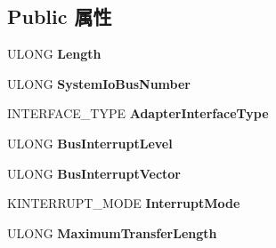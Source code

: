 \subsection*{Public 属性}
\begin{DoxyCompactItemize}
\item 
\mbox{\label{struct___p_o_r_t___c_o_n_f_i_g_u_r_a_t_i_o_n___i_n_f_o_r_m_a_t_i_o_n_acfa4e1f80fb1d9cda05190c6407d4021}} 
U\+L\+O\+NG {\bfseries Length}
\item 
\mbox{\label{struct___p_o_r_t___c_o_n_f_i_g_u_r_a_t_i_o_n___i_n_f_o_r_m_a_t_i_o_n_aaa068c659c7bdca99e1ef44c0681c4c6}} 
U\+L\+O\+NG {\bfseries System\+Io\+Bus\+Number}
\item 
\mbox{\label{struct___p_o_r_t___c_o_n_f_i_g_u_r_a_t_i_o_n___i_n_f_o_r_m_a_t_i_o_n_a58bdd656c1e81b72fab8680e5b5e6236}} 
I\+N\+T\+E\+R\+F\+A\+C\+E\+\_\+\+T\+Y\+PE {\bfseries Adapter\+Interface\+Type}
\item 
\mbox{\label{struct___p_o_r_t___c_o_n_f_i_g_u_r_a_t_i_o_n___i_n_f_o_r_m_a_t_i_o_n_aca730a18d81b0ef663eb3ac8f195de1d}} 
U\+L\+O\+NG {\bfseries Bus\+Interrupt\+Level}
\item 
\mbox{\label{struct___p_o_r_t___c_o_n_f_i_g_u_r_a_t_i_o_n___i_n_f_o_r_m_a_t_i_o_n_ae5a05e75ccf4114a301c543dc7aaea48}} 
U\+L\+O\+NG {\bfseries Bus\+Interrupt\+Vector}
\item 
\mbox{\label{struct___p_o_r_t___c_o_n_f_i_g_u_r_a_t_i_o_n___i_n_f_o_r_m_a_t_i_o_n_a36ae0c0e69d6c4f5cb04b3ac5bb628c0}} 
K\+I\+N\+T\+E\+R\+R\+U\+P\+T\+\_\+\+M\+O\+DE {\bfseries Interrupt\+Mode}
\item 
\mbox{\label{struct___p_o_r_t___c_o_n_f_i_g_u_r_a_t_i_o_n___i_n_f_o_r_m_a_t_i_o_n_a7cdca91d2712905d8b825a3614cf1307}} 
U\+L\+O\+NG {\bfseries Maximum\+Transfer\+Length}

\end{DoxyCompactItemize}
